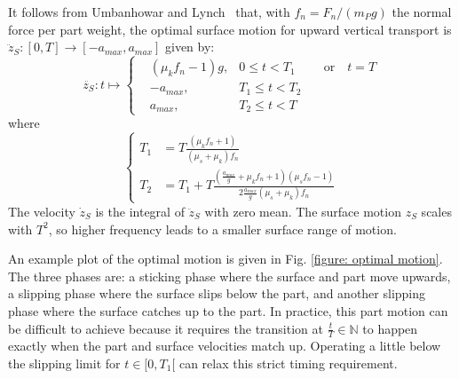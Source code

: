 It follows from Umbanhowar and Lynch~\cite{umbanhowar2008optimal} that, with $f_n = F_n / (m_P g)$ the normal force per part weight, the optimal surface motion for upward vertical transport is $\ddot{z}_S \colon \left[0,T\right] \rightarrow \left[-a_{max}, a_{max}\right]$ given by:
%
\begin{equation}
    \ddot{z_S}\colon t \mapsto
    \left\{\begin{aligned} 
        &(\mu_k f_n -1) g, &0 \leq t < T_1 &\quad \text{or} \quad t = T\\
        &-a_{max}, &T_1 \leq t < T_2\\
        &a_{max}, &T_2 \leq t < T
    \end{aligned} \right.
\end{equation}
%
where
%
\begin{equation}
\left\{\begin{aligned} 
    T_1 &= T \frac{(\mu_k f_n + 1)}{(\mu_s+\mu_k)f_n}\\
    T_2 &= T_1 + T \frac{(\frac{a_{max}}{g} + \mu_k f_n + 1)(\mu_s f_n -1)}{2\frac{a_{max}}{g}(\mu_s+\mu_k)f_n}
\end{aligned} \right.
\end{equation}
%
The velocity $\dot{z}_S$ is the integral of $\ddot{z}_S$ with zero mean. The surface motion $z_S$ scales with $T^2$, so higher frequency leads to a smaller surface range of motion.
%

An example plot of the optimal motion is given in Fig. \ref{figure: optimal motion}.
%
The three phases are: a sticking phase where the surface and part move upwards, a slipping phase where the surface slips below the part, and another slipping phase where the surface catches up to the part.
%
In practice, this part motion can be difficult to achieve because it requires the transition at $\frac{t}{T}\in \mathbb{N}$ to happen exactly when the part and surface velocities match up. Operating a little below the slipping limit for $t \in [0, T_1[$ can relax this strict timing requirement.

